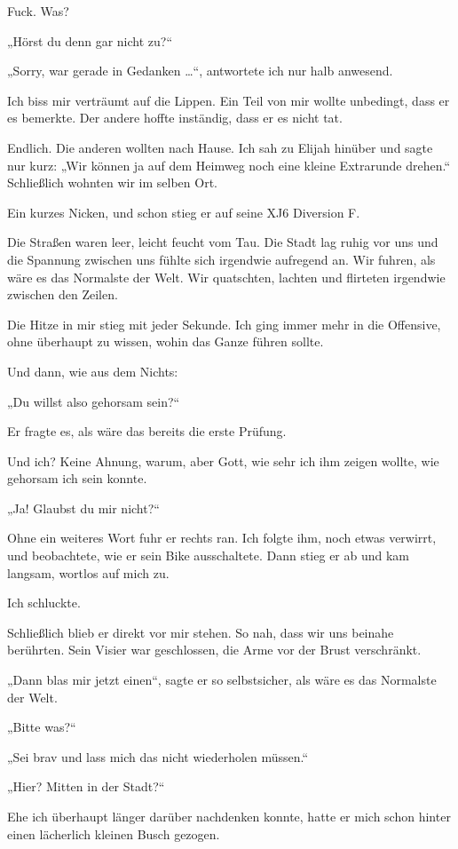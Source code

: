 Fuck. Was?

„Hörst du denn gar nicht zu?“

„Sorry, war gerade in Gedanken …“, antwortete ich nur halb anwesend.

Ich biss mir verträumt auf die Lippen. Ein Teil von mir wollte unbedingt, dass er es bemerkte. Der andere hoffte inständig, dass er es nicht tat.


Endlich. Die anderen wollten nach Hause. Ich sah zu Elijah hinüber und sagte nur kurz: „Wir können ja auf dem Heimweg noch eine kleine Extrarunde drehen.“ Schließlich wohnten wir im selben Ort.

Ein kurzes Nicken, und schon stieg er auf seine XJ6 Diversion F.

Die Straßen waren leer, leicht feucht vom Tau. Die Stadt lag ruhig vor uns und die Spannung zwischen uns fühlte sich irgendwie aufregend an. Wir fuhren, als wäre es das Normalste der Welt. Wir quatschten, lachten und flirteten irgendwie zwischen den Zeilen.

Die Hitze in mir stieg mit jeder Sekunde. Ich ging immer mehr in die Offensive, ohne überhaupt zu wissen, wohin das Ganze führen sollte.

Und dann, wie aus dem Nichts:

„Du willst also gehorsam sein?“

Er fragte es, als wäre das bereits die erste Prüfung.

Und ich? Keine Ahnung, warum, aber Gott, wie sehr ich ihm zeigen wollte, wie gehorsam ich sein konnte.

„Ja! Glaubst du mir nicht?“

Ohne ein weiteres Wort fuhr er rechts ran. Ich folgte ihm, noch etwas verwirrt, und beobachtete, wie er sein Bike ausschaltete. Dann stieg er ab und kam langsam, wortlos auf mich zu.

Ich schluckte.

Schließlich blieb er direkt vor mir stehen. So nah, dass wir uns beinahe berührten. Sein Visier war geschlossen, die Arme vor der Brust verschränkt.

„Dann blas mir jetzt einen“, sagte er so selbstsicher, als wäre es das Normalste der Welt.

„Bitte was?“

„Sei brav und lass mich das nicht wiederholen müssen.“

„Hier? Mitten in der Stadt?“

Ehe ich überhaupt länger darüber nachdenken konnte, hatte er mich schon hinter einen lächerlich kleinen Busch gezogen.

